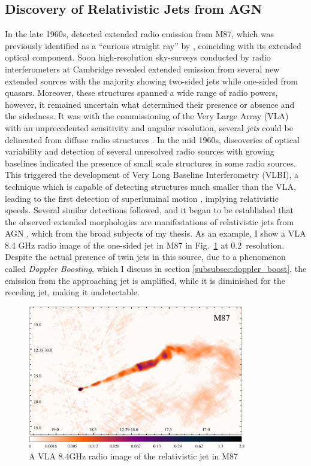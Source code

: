 \subsection{Discovery of Relativistic Jets from AGN}
In the late 1960s, \citet{hogg1969synthesis} detected extended radio emission from M87, which was previously identified as a ``curious straight ray'' by \citet{curtis1918descriptions}, coinciding with its extended optical component. Soon high-resolution sky-surveys conducted by radio interferometers at Cambridge revealed extended emission from several new extended sources \citep[e.g.,][]{1973MNRAS.165..369N,turland19753c} with the majority showing two-sided jets while one-sided from quasars. Moreover, these structures spanned a wide range of radio powers, however, it remained uncertain   what determined their presence or absence and the sidedness. It was with the commissioning of the Very Large Array (VLA) with an unprecedented sensitivity and angular resolution, several \textit{jets} could be delineated from diffuse radio structures \citep[e.g.,][]{bridle1984extragalactic}. In the mid 1960s, discoveries of optical variability and detection of several unresolved radio sources with growing baselines indicated the presence of small scale structures in some radio sources. This triggered the development of Very Long Baseline Interferometry (VLBI), a technique which is capable of detecting structures much smaller than the VLA, leading to the first detection of superluminal motion \citep{whitney1971quasars,cohen1971small}, implying relativistic speeds. Several similar detections followed, and it began to be established that the observed extended morphologies are manifestations of relativistic jets from AGN \citep{blandford1979relativistic,konigl1980relativistic}, which from the broad subjects of my thesis. As an example, I show a VLA 8.4 GHz radio image of the one-sided jet in M87 in Fig.~\ref{fig:M87_showpiece} at 0.2\as~resolution. Despite the actual presence of twin jets in this source, due to a phenomenon called \textit{Doppler Boosting}, which I discuss in section \ref{subsubsec:doppler_boost}, the emission from the approaching jet is amplified, while it is diminished for the receding jet, making it undetectable.
\begin{figure}
    \centering
    \includegraphics[width=0.849\textwidth]{images/misc/M87_thesis_showpeice-crop.pdf}
    \caption{A VLA 8.4GHz radio image of the relativistic jet in M87 \label{fig:M87_showpiece}}
\end{figure}

